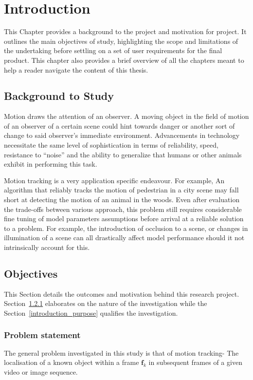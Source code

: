 \chapter{Introduction}\label{chapter_introduction}
This Chapter provides a background to the project and motivation for project.
It outlines the main objectives of study, highlighting the scope and limitations
of the undertaking before settling on a set of user requirements for the final
product.
This chapter also provides a brief overview of all the chapters meant to help a
reader navigate the content of this thesis.

\section{Background to Study}
Motion draws the attention of an observer. A moving object in the field of
motion of an observer of a certain scene could hint towards danger or another
sort of change to said observer's immediate environment. Advancements in
technology necessitate the same level of sophistication in terms of
reliability, speed, resistance to ``noise'' and the ability to generalize that
humans or other animals exhibit in performing this task.

Motion tracking is a very application specific endeavour. For example, An
algorithm that reliably tracks the motion of pedestrian in a city scene may fall
short at detecting the motion of an animal in the woods. Even after evaluation
the trade-offs between various approach, this problem still requires
considerable fine tuning of model parameters assumptions before arrival at a
reliable solution to a problem. For example, the introduction of occlusion to a
scene, or changes in illumination of a scene can all drastically affect model
performance should it not intrinsically account for this.

\section{Objectives}\label{introduction_objectives}
This Section details the outcomes and motivation behind this research project.
Section~\ref{introduction_problem} elaborates on the nature of the investigation
while the Section~\ref{introduction_purpose} qualifies the investigation.

\subsection{Problem statement}\label{introduction_problem}
The general problem investigated in this study is that of motion tracking- The
localisation of a known object within a frame $\mathbf{f}_k$ in subsequent
frames of a given video or image sequence.  

